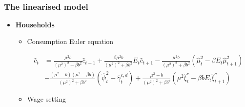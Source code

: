 \documentclass[9pt]{beamer}
\begin{document}
\begin{frame}[noframenumbering]
\frametitle{The linearised model}
\label{DomUnit4}
\hyperlink{frame4}{}
\begin{itemize}
    \item \textbf{Households}
    \begin{itemize}
        \item Consumption Euler equation
        
        $$
\begin{aligned}
\hat{c}_{t} &=\frac{\mu^{2} b}{\left(\mu^{2}\right)^{2}+\beta b^{2}} \hat{c}_{t-1}+\frac{\beta \mu^{2} b}{\left(\mu^{2}\right)^{2}+\beta b^{2}} E_{t} \hat{c}_{t+1}-\frac{\mu^{2} b}{\left(\mu^{2}\right)^{2}+\beta b^{2}}\left(\hat{\mu}_{t}^{2}-\beta E_{t} \hat{\mu}_{t+1}^{2}\right) \\
&-\frac{\left(\mu^{2}-b\right)\left(\mu^{2}-\beta b\right)}{\left(\mu^{2}\right)^{2}+\beta b^{2}}\left(\hat{\psi}_{t}^{2}+\hat{\gamma}_{t}^{c, d}\right)+\frac{\mu^{2}-b}{\left(\mu^{2}\right)^{2}+\beta b^{2}}\left(\mu^{2} \hat{\xi}_{t}^{c}-\beta b E_{t} \hat{\xi}_{t+1}^{c}\right)
\end{aligned}
$$


    \item Wage setting
    

\end{itemize}
\end{itemize}
\end{frame}
\end{document}
